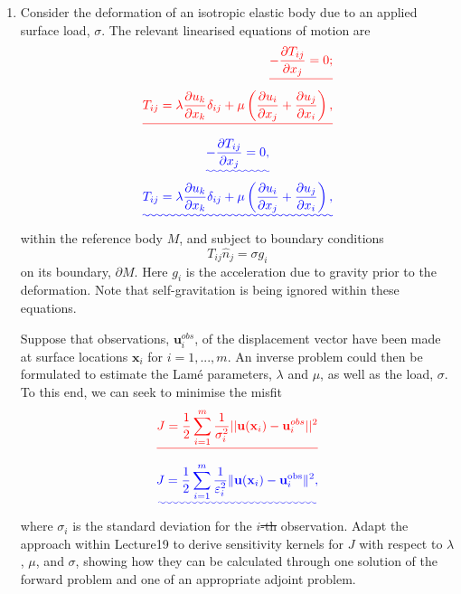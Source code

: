\documentclass[a4paper,10pt]{paper}
\providecommand{\DIFadd}[1]{{\protect\color{blue}\uwave{#1}}} %
\providecommand{\DIFdel}[1]{{\protect\color{red}\sout{#1}}}                      %
\providecommand{\DIFaddbegin}{} %
\providecommand{\DIFaddend}{} %
\providecommand{\DIFdelbegin}{} %
\providecommand{\DIFdelend}{} %
\begin{document}
\begin{enumerate}
\item Consider the deformation of an isotropic elastic body due to an applied surface load, $\sigma$. The relevant linearised equations of motion are
\DIFdelbegin \begin{eqnarray*}
    \DIFdel{-\frac{\partial T_{ij}}{\partial x_{j}}=0; }\\
    \DIFdel{T_{ij}=\lambda\frac{\partial u_{k}}{\partial x_{k}}\delta_{ij}+\mu\left(\frac{\partial u_{i}}{\partial x_{j}}+\frac{\partial u_{j}}{\partial x_{i}}\right),
}\end{eqnarray*}%
\DIFdelend \DIFaddbegin \begin{gather*}
    \DIFadd{-\frac{\partial T_{ij}}{\partial x_{j}}=0, }\\
    \DIFadd{T_{ij}=\lambda\frac{\partial u_{k}}{\partial x_{k}}\delta_{ij}+\mu\left(\frac{\partial u_{i}}{\partial x_{j}}+\frac{\partial u_{j}}{\partial x_{i}}\right),
}\end{gather*}\DIFaddend 
within the reference body $M$, and subject to boundary conditions
\begin{equation*}
    T_{ij}\hat{n}_{j}=\sigma g_{i}
\end{equation*}
on its boundary, $\partial M$. Here $g_{i}$ is the acceleration due to gravity prior to the deformation. Note that self-gravitation is being ignored within these equations.

Suppose that observations, \DIFdelbegin \DIFdel{$\mathbf{u}_{i}^{obs}$}\DIFdelend \DIFaddbegin \DIFadd{$\mathbf{u}_{i}^{\mathrm{obs}}$}\DIFaddend , of the displacement vector have been made at surface locations $\mathbf{x}_i$ for \DIFdelbegin \DIFdel{$i=1,...,m$}\DIFdelend \DIFaddbegin \DIFadd{$i=1,\dots,m$}\DIFaddend . An inverse problem could then be formulated to estimate the Lamé parameters, $\lambda$ and $\mu$, as well as the load, $\sigma$. To this end, we can seek to minimise the misfit
\DIFdelbegin \begin{displaymath}
    \DIFdel{J=\frac{1}{2}\sum_{i=1}^{m}\frac{1}{\sigma_{i}^2}||\mathbf{u}(\mathbf{x}_{i})-\mathbf{u}_{i}^{obs}||^{2}
}\end{displaymath}%
\DIFdelend \DIFaddbegin \begin{equation*}
    \DIFadd{J=\frac{1}{2}\sum_{i=1}^{m}\frac{1}{\varepsilon_{i}^{2}}\|\mathbf{u}(\mathbf{x}_{i})-\mathbf{u}_{i}^{\mathrm{obs}}\|^{2},
}\end{equation*}\DIFaddend 
where \DIFdelbegin \DIFdel{$\sigma_{i}$ }\DIFdelend \DIFaddbegin \DIFadd{$\varepsilon_{i}$ }\DIFaddend is the standard deviation for the $i$\DIFdelbegin \DIFdel{-th }\DIFdelend \DIFaddbegin \DIFadd{th }\DIFaddend observation. Adapt the approach within Lecture\DIFaddbegin \DIFadd{~}\DIFaddend 19 to derive sensitivity kernels for $J$ with respect to $\lambda$, $\mu$, and $\sigma$, showing how they can be calculated through one solution of the forward problem and one of an appropriate adjoint problem.






\end{enumerate}
\end{document}

